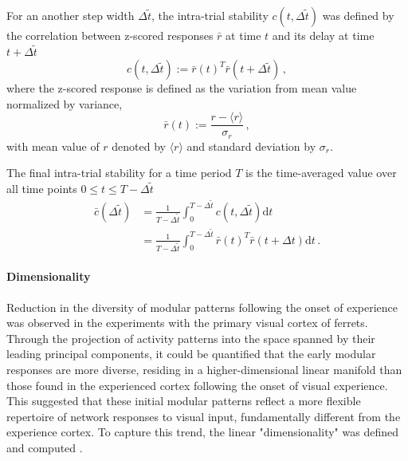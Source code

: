 \documentclass[11pt]{article}
\begin{document}
{	For an another step width $\Delta \tilde{t}$, the intra-trial stability $c(t, \Delta \tilde{t})$ was defined by the correlation between z-scored responses $\bar{r}$ at time $t$ and its delay at time $t + \Delta \tilde{t}$ 
		\begin{equation}
			c(t, \Delta \tilde{t}) := \bar{r}(t)^T \bar{r}(t + \Delta \tilde{t}) \, , 
		\end{equation}
	where the z-scored response is defined as the variation from mean value normalized by variance, 
		\begin{equation}
			\bar{r}(t) := \frac{r - \langle r \rangle}{\sigma_r} \, ,
		\end{equation}
	with mean value of $r$ denoted by $\langle r \rangle$ and standard deviation by $\sigma_r$. 
	
	The final intra-trial stability for a time period $T$ is the time-averaged value over all time points $0 \leq t \leq T - \Delta \tilde{t}$
		\begin{equation} \label{eq:its_sym}
			\begin{split}
				\bar{c}{(\Delta \tilde{t})} &= \frac{1}{T-\Delta \tilde{t}} \int_{0}^{T-\Delta \tilde{t}} c(t, \Delta \tilde{t}) \mathrm{d} t\\
				                            &= \frac{1}{T-\Delta \tilde{t}} \int_{0}^{T-\Delta \tilde{t}} \bar{r}(t)^T \bar{r}(t + \Delta t) \mathrm{d} t \, .
			\end{split} 
		\end{equation}
	
	\paragraph{Dimensionality}
	
	Reduction in the diversity of modular patterns following the onset of experience was observed in the experiments with the primary visual cortex of ferrets. Through the projection of activity patterns into the space spanned by their leading principal components, it could be quantified that the early modular responses are more diverse, residing in a higher-dimensional linear manifold than those found in the experienced cortex following the onset of visual experience. This suggested that these initial modular patterns reflect a more flexible repertoire of network responses to visual input, fundamentally different from the experience cortex. To capture this trend, the linear "dimensionality" was defined and computed \cite{tragenap2023nature}. 
	
}
\end{document}
